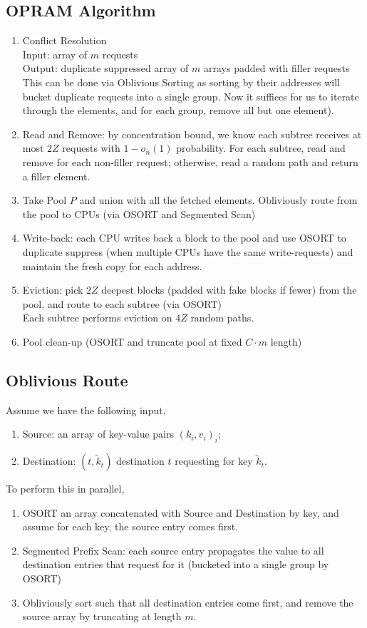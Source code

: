   \subsection{OPRAM Algorithm}
\begin{enumerate}
	\item Conflict Resolution 
	\\ Input: array of $m$ requests\\
	Output: duplicate suppressed array of $m$ arrays padded with filler requests\\
	This can be done via Oblivious Sorting as sorting by their addresses will bucket duplicate requests into a single group. Now it suffices for us to iterate through the elements, and for each group, remove all but one element).
	\item Read and Remove: by concentration bound, we know each subtree receives at most $2Z$ requests with $1-o_n(1)$ probability. For each subtree, read and remove for each non-filler request; otherwise, read a random path and return a filler element.
	\item Take Pool $P$ and union with all the fetched elements. Obliviously route from the pool to CPUs (via OSORT and Segmented Scan)
	\item Write-back: each CPU writes back a block to the pool and use OSORT to duplicate suppress (when multiple CPUs have the same write-requests) and maintain the fresh copy for each address.
	\item Eviction: pick $2Z$ deepest blocks (padded with fake blocks if fewer) from the pool, and route to each subtree (via OSORT)\\
	Each subtree performs eviction on $4Z$ random paths.
	\item Pool clean-up (OSORT and truncate pool at fixed $C\cdot m$ length)
	\end{enumerate}   


\subsection{Oblivious Route}
Assume we have the following input,\begin{enumerate}
	\item Source: an array of key-value pairs $(k_i,v_i)_i$;
	\item Destination: $(t, \tilde{k}_t)$ destination $t$ requesting for key $\tilde{k}_t$.
\end{enumerate}
To perform this in parallel, \begin{enumerate}
	\item OSORT an array concatenated with Source and Destination by key, and assume for each key, the source entry comes first.
	\item Segmented Prefix Scan: each source entry propagates the value to all destination entries that request for it (bucketed into a single group by OSORT)
	\item Obliviously sort such that all destination entries come first, and remove the source array by truncating at length $m$.
\end{enumerate}

